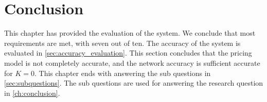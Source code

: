 \section{Conclusion}
This chapter has provided the evaluation of the system. We conclude that most requirements are met, with seven out of ten. The accuracy of the system is evaluated in \autoref{sec:accuracy_evaluation}. This section concludes that the pricing model is not completely accurate, and the network accuracy is sufficient accurate for $K = 0$. This chapter ends with answering the sub questions in \autoref{sec:subquestions}. The sub questions are used for answering the research question in \autoref{ch:conclusion}.